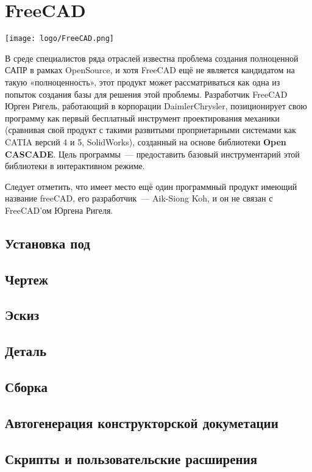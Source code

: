 \chapter{FreeCAD}

\texttt{[image: logo/FreeCAD.png]}


В среде специалистов ряда отраслей известна проблема создания полноценной САПР в
рамках OpenSource, и хотя FreeCAD ещё не является кандидатом на такую
«полноценность», этот продукт может рассматриваться как одна из попыток создания
базы для решения этой проблемы. Разработчик FreeCAD Юрген Ригель, работающий в
корпорации DaimlerChrysler, позиционирует свою программу как первый бесплатный
инструмент проектирования механики (сравнивая свой продукт с такими развитыми
проприетарными системами как CATIA версий 4 и 5, SolidWorks), созданный на
основе библиотеки \textbf{Open CASCADE}. Цель программы\ --- предоставить
базовый инструментарий этой библиотеки в интерактивном режиме.

Следует отметить, что имеет место ещё один программный продукт имеющий название
freeCAD, его разработчик\ --- Aik-Siong Koh, и он не связан с FreeCAD’ом Юргена
Ригеля.

\section{Установка под \win}


\section{Чертеж}

\section{Эскиз}

\section{Деталь}

\section{Сборка}

\section{Автогенерация конструкторской докуметации}

\section{Скрипты и пользовательские расширения}

